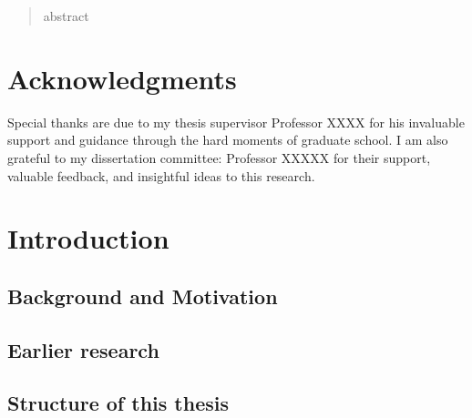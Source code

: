 \documentclass[12pt]{report}
\begin{document}
\author{Your Name}
\date{December 20XX}
\maketitle

\begin{abstract}

abstract
 
\end{abstract}

\chapter*{Acknowledgments}
\setcounter{page}{3} %

{%
\hspace{1em} Special thanks are due to my thesis supervisor Professor
XXXX for his invaluable support and guidance through the hard
moments of graduate school.
I am also grateful to my dissertation committee: Professor XXXXX for
their support, valuable feedback, and insightful ideas to this research.
}%

\tableofcontents
\listoffigures
{}
\listoftables
{}



\chapter{Introduction}
\setcounter{page}{1}   %

\section{Background and Motivation}
\section{Earlier research}
\section{Structure of this thesis}
\end{document}
